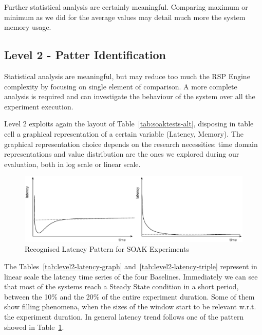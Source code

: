 Further statistical analysis are certainly meaningful. Comparing maximum or minimum as we did for the average values may detail much more the system memory usage. %

\subsection{Level 2 - Patter Identification}\label{sec:eval-level2}

Statistical analysis are meaningful, but may reduce too much the RSP Engine complexity by focusing on single element of comparison. A more complete analysis is required and \name can investigate the behaviour of the system over all the experiment execution.

Level 2 exploits again the layout of Table~\ref{tab:soaktests-alt}, disposing in table cell a graphical representation of a certain variable (Latency, Memory). The graphical representation choice depends on the research necessities: time domain representations and value distribution are the ones we explored during our evaluation, both in log scale or linear scale.

\begin{figure}[h!tbp]
  \centering
	\includegraphics[width=\linewidth]{images/level2-pattern}
	\caption[\textsc{Analyser} Investigation Stack - Level 2 - Recognised Latency Patterns for SOAK Experiments]{Recognised Latency Pattern for SOAK Experiments} 
  	\label{fig:level2-pattern}
\end{figure}

The Tables~\ref{tab:level2-latency-graph} and~\ref{tab:level2-latency-triple} represent in linear scale the latency time series of the four Baselines. Immediately we can see that most of the systems reach a Steady State condition in a short period, between the 10\% and the 20\% of the entire experiment duration. Some of them show filling phenomena, when the sizes of the window start to be relevant w.r.t. the experiment duration. In general latency trend follows one of the pattern showed in Table~\ref{fig:level2-pattern}. %

